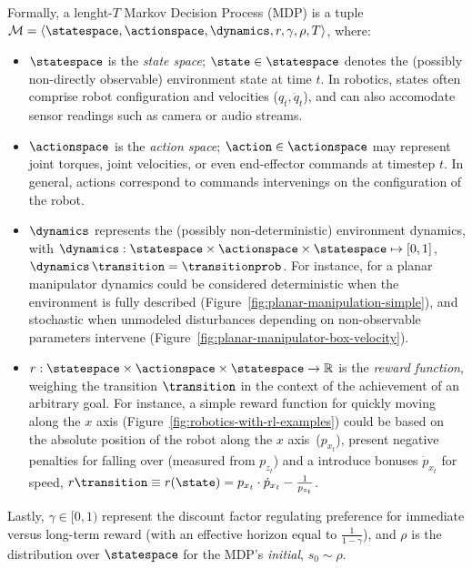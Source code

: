 Formally, a lenght-\(T\) Markov Decision Process (MDP) is a tuple \( \mathcal M = \langle \statespace, \actionspace, \dynamics, r, \gamma, \rho, T \rangle \), where:
\begin{itemize}
    \item \(\statespace\) is the \emph{state space}; \(\state \in \statespace\) denotes the (possibly non-directly observable) environment state at time \(t\). In robotics, states often comprise robot configuration and velocities (\(q_t, \dot q_t\)), and can also accomodate sensor readings such as camera or audio streams.
    \item \(\actionspace\) is the \emph{action space}; \(\action \in \actionspace\) may represent joint torques, joint velocities, or even end-effector commands at timestep \( t \). In general, actions correspond to commands intervenings on the configuration of the robot. 
    \item \(\dynamics\) represents the (possibly non-deterministic) environment dynamics, with \(\dynamics: \statespace \times \actionspace \times \statespace \mapsto [0, 1] \), \( \dynamics \, \transition = \transitionprob \). For instance, for a planar manipulator dynamics could be considered deterministic when the environment is fully described (Figure~\ref{fig:planar-manipulation-simple}), and stochastic when unmodeled disturbances depending on non-observable parameters intervene (Figure~\ref{fig:planar-manipulator-box-velocity}).
    \item \(r: \statespace \times \actionspace \times \statespace \to \mathbb R\) is the \emph{reward function}, weighing the transition \( \transition \) in the context of the achievement of an arbitrary goal. For instance, a simple reward function for quickly moving along the \( x \) axis (Figure~\ref{fig:robotics-with-rl-examples}) could be based on the absolute position of the robot along the \( x \) axis~(\(p_{x_t}\)), present negative penalties for falling over (measured from \( p_{z_t} \)) and a introduce bonuses \( \dot p_{x_t} \) for speed, \(r \transition \equiv r(\state) = p_{x_t} \cdot \dot p_{x_t} - \tfrac{1}{p_{z_t}} \).
\end{itemize}
Lastly, \(\gamma \in [0,1) \) represent the discount factor regulating preference for immediate versus long-term reward (with an effective horizon equal to \( \tfrac{1}{1-\gamma} \)), and \( \rho \) is the distribution over \(\statespace \) for the MDP's \emph{initial}, \( s_0 \sim \rho \).

